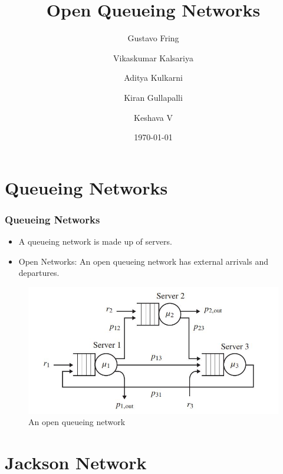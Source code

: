 \documentclass[10pt,notes]{beamer}
\title{Open Queueing Networks}
\author{Gustavo Fring \and Vikaskumar Kalsariya \and Aditya Kulkarni \and Kiran Gullapalli \and Keshava V}
\date{\today}
\begin{document}
\begin{frame}
    \titlepage
\end{frame}

\begin{frame}
    \tableofcontents
\end{frame}

\section{Queueing Networks}

\begin{frame}
    \frametitle{Queueing Networks}
    \begin{itemize}
        \item A queueing network is made up of servers.
        \item Open Networks: An open queueing network has external arrivals and departures.
    \end{itemize}
    \begin{figure}
        \includegraphics[width=0.65\linewidth]{images/open_network.jpg}
        \caption{An open queueing network}
    \end{figure}
\end{frame}


\section{Jackson Network}
\end{document}
